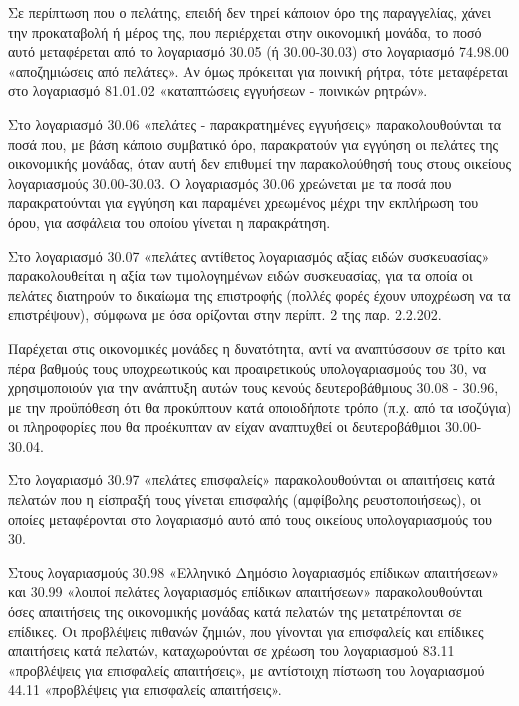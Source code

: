 \documentclass[A4,10pt,greek]{book}
\begin{document}
Σε περίπτωση που ο πελάτης, επειδή δεν τηρεί κάποιον όρο της παραγγελίας, χάνει την προκαταβολή ή μέρος της, που περιέρχεται στην οικονομική μονάδα, το ποσό αυτό μεταφέρεται από το λογαριασμό 30.05 (ή 30.00-30.03) στο λογαριασμό 74.98.00 «αποζημιώσεις από πελάτες». Αν όμως πρόκειται για ποινική ρήτρα, τότε μεταφέρεται στο λογαριασμό 81.01.02 «καταπτώσεις εγγυήσεων - ποινικών ρητρών».

Στο λογαριασμό 30.06 «πελάτες - παρακρατημένες εγγυήσεις» παρακολουθούνται τα ποσά που, με βάση κάποιο συμβατικό όρο, παρακρατούν για εγγύηση οι πελάτες της οικονομικής μονάδας, όταν αυτή δεν επιθυμεί την παρακολούθησή τους στους οικείους λογαριασμούς 30.00-30.03. Ο λογαριασμός 30.06 χρεώνεται με τα ποσά που παρακρατούνται για εγγύηση και παραμένει χρεωμένος μέχρι την εκπλήρωση του όρου, για ασφάλεια του οποίου γίνεται η παρακράτηση.

Στο λογαριασμό 30.07 «πελάτες αντίθετος λογαριασμός αξίας ειδών συσκευασίας» παρακολουθείται η αξία των τιμολογημένων ειδών συσκευασίας, για τα οποία οι πελάτες διατηρούν το δικαίωμα της επιστροφής (πολλές φορές έχουν υποχρέωση να τα επιστρέψουν), σύμφωνα με όσα ορίζονται στην περίπτ. 2 της παρ. 2.2.202.

Παρέχεται στις οικονομικές μονάδες η δυνατότητα, αντί να αναπτύσσουν σε τρίτο και πέρα βαθμούς τους υποχρεωτικούς και προαιρετικούς υπολογαριασμούς του 30, να χρησιμοποιούν για την ανάπτυξη αυτών τους κενούς δευτεροβάθμιους 30.08 - 30.96, με την προϋπόθεση ότι θα προκύπτουν κατά οποιοδήποτε τρόπο (π.χ. από τα ισοζύγια) οι πληροφορίες που θα προέκυπταν αν είχαν αναπτυχθεί οι δευτεροβάθμιοι 30.00-30.04.

Στο λογαριασμό 30.97 «πελάτες επισφαλείς» παρακολουθούνται οι απαιτήσεις κατά πελατών που η είσπραξή τους γίνεται επισφαλής (αμφίβολης ρευστοποιήσεως), οι οποίες μεταφέρονται στο λογαριασμό αυτό από τους οικείους υπολογαριασμούς του 30.

Στους λογαριασμούς 30.98 «Ελληνικό Δημόσιο λογαριασμός επίδικων απαιτήσεων» και 30.99 «λοιποί πελάτες λογαριασμός επίδικων απαιτήσεων» παρακολουθούνται όσες απαιτήσεις της οικονομικής μονάδας κατά πελατών της μετατρέπονται σε επίδικες.  Οι προβλέψεις πιθανών ζημιών, που γίνονται για επισφαλείς και επίδικες απαιτήσεις κατά πελατών, καταχωρούνται σε χρέωση του λογαριασμού 83.11 «προβλέψεις για επισφαλείς απαιτήσεις», με αντίστοιχη πίστωση του λογαριασμού 44.11 «προβλέψεις για επισφαλείς απαιτήσεις».
\end{document}
